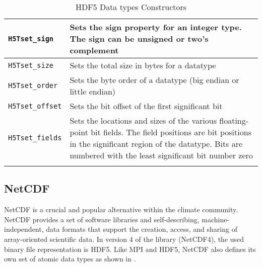 \begin{longtable}{|>{\centering\arraybackslash} m{5.5cm} | >{\centering\arraybackslash} m{6cm} |}
        \small \texttt{H5Tset\_sign}             & \small Sets the sign property for an integer type. The sign can be unsigned or two's complement                                                                    \\ \hline
        \small \texttt{H5Tset\_size}             & \small Sets the total size in bytes for a datatype                                  \\ \hline
        \small \texttt{H5Tset\_order}            & \small Sets the byte order of a datatype (big endian or little endian)              \\ \hline
        \small \texttt{H5Tset\_offset}           & \small Sets the bit offset of the first significant bit                             \\ \hline
        \small \texttt{H5Tset\_fields}           & \small Sets the locations and sizes of the various floating-point bit fields. The field positions are bit positions in the significant region of the datatype. Bits are numbered with the least significant bit number zero                        \\ \hline
        \caption{HDF5 Data types Constructors}
        \label{table: hdf5-constr}
\end{longtable}

\clearpage

\subsection{NetCDF}

NetCDF is a crucial and popular alternative within the climate community. NetCDF provides a set of software libraries and self-describing, machine-independent, data formats that support the creation, access, and sharing of array-oriented scientific data.
In version 4 of the library (NetCDF4), the used binary file representation is HDF5. Like MPI and HDF5, NetCDF also defines its own set of atomic data types as shown in .

